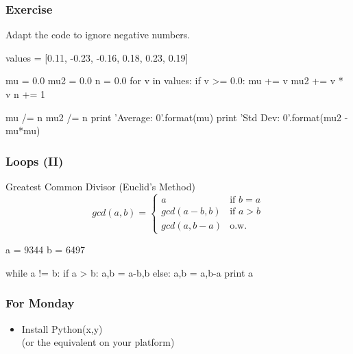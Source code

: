\begin{frame}[fragile]
\frametitle{Exercise}

Adapt the code to ignore negative numbers.

\pause

\begin{python}
values = [0.11, -0.23, -0.16, 0.18, 0.23, 0.19]

mu = 0.0
mu2 = 0.0
n = 0.0
for v in values:
    if v >= 0.0:
        mu += v
        mu2 += v * v
        n += 1

mu /= n
mu2 /= n
print 'Average: {0}'.format(mu)
print 'Std Dev: {0}'.format(mu2 - mu*mu)
\end{python}

\end{frame}


\begin{frame}[fragile]
\frametitle{Loops (II)}

\begin{block}{Greatest Common Divisor (Euclid's Method)}
\[
gcd(a,b) = \begin{cases}
            a & \text{if $b = a$}\\
            gcd(a-b, b) & \text{if $a > b$} \\
            gcd(a, b-a) & \text{o.w.}
            \end{cases}
\]
\end{block}

\pause
\begin{python}
a = 9344
b = 6497

while a != b:
    if a > b:
        a,b = a-b,b
    else:
        a,b = a,b-a
print a
\end{python}

\end{frame}

\begin{frame}
\frametitle{For Monday}

\begin{itemize}
\item Install Python(x,y)\\
    (or the equivalent on your platform)
\end{itemize}
\end{frame}


